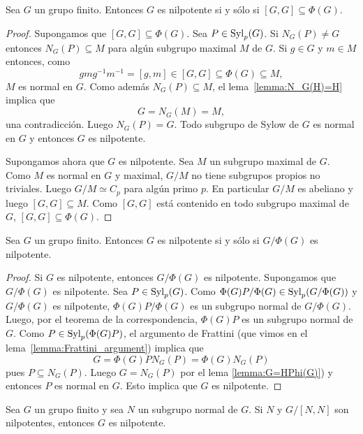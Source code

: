 \begin{theorem}[Wielandt]
	\label{theorem:Wielandt}
	Sea $G$ un grupo finito. Entonces $G$ es nilpotente si y sólo si
	$[G,G]\subseteq\Phi(G)$.
\end{theorem}

\begin{proof}
	Supongamos que $[G,G]\subseteq\Phi(G)$. Sea $P\in\mathrm{Syl}_p(G)$. Si $N_G(P)\ne
	G$ entonces $N_G(P)\subseteq M$ para algún subgrupo maximal $M$ de $G$. Si
	$g\in G$ y $m\in M$ entonces, como 
	\[
		gmg^{-1}m^{-1}=[g,m]\in [G,G]\subseteq\Phi(G)\subseteq M,
	\]
	$M$ es normal en $G$. Como además $N_G(P)\subseteq M$, el
	lema~\ref{lemma:N_G(H)=H} implica que 
	\[
	G=N_G(M)=M,
	\]
	una contradicción.
	Luego $N_G(P)=G$. Todo subgrupo de Sylow de $G$ es normal en $G$ y entonces
	$G$ es nilpotente.

	Supongamos ahora que $G$ es nilpotente. Sea $M$ un subgrupo maximal de $G$.
	Como $M$ es normal en $G$ y maximal, $G/M$ no tiene subgrupos propios no triviales.
	Luego $G/M\simeq C_p$ para algún primo $p$. En particular $G/M$ es abeliano
	y luego $[G,G]\subseteq M$. Como $[G,G]$ está contenido en
	todo subgrupo maximal de $G$, $[G,G]\subseteq\Phi(G)$.
\end{proof}

\begin{theorem}
	\label{theorem:G/phi(G)}
	Sea $G$ un grupo finito. Entonces $G$ es nilpotente si y sólo si
	$G/\Phi(G)$ es nilpotente.
\end{theorem}

\begin{proof}
	Si $G$ es nilpotente, entonces $G/\Phi(G)$ es nilpotente. Supongamos que $G/\Phi(G)$ es
	nilpotente. Sea $P\in\mathrm{Syl}_p(G)$. Como
	$\Phi(G)P/\Phi(G)\in\mathrm{Syl}_p(G/\Phi(G))$ y $G/\Phi(G)$ es nilpotente,
	$\Phi(G)P/\Phi(G)$ es un subgrupo normal de $G/\Phi(G)$. Luego, por el
	teorema de la correspondencia, $\Phi(G)P$ es un subgrupo normal de $G$.
	Como $P\in\mathrm{Syl}_p(\Phi(G)P)$, el argumento de Frattini 
	(que vimos en el lema~\ref{lemma:Frattini_argument}) implica que
	\[
		G=\Phi(G)PN_G(P)=\Phi(G)N_G(P)
	\]
	pues $P\subseteq N_G(P)$. Luego $G=N_G(P)$ por el
	lema \ref{lemma:G=HPhi(G)}) 
	y entonces $P$ es normal en $G$. Esto
	implica que $G$ es nilpotente.
\end{proof}

\begin{theorem}[Hall]
	\label{theorem:Hall_nilpotente}
	Sea $G$ un grupo finito y sea $N$ un subgrupo normal de $G$. Si $N$ y
	$G/[N,N]$ son nilpotentes, entonces $G$ es nilpotente.
\end{theorem}

